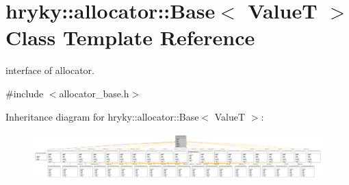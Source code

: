 \hypertarget{classhryky_1_1allocator_1_1_base}{\section{hryky\-:\-:allocator\-:\-:Base$<$ Value\-T $>$ Class Template Reference}
\label{classhryky_1_1allocator_1_1_base}
}


interface of allocator.  




{\ttfamily \#include $<$allocator\-\_\-base.\-h$>$}



Inheritance diagram for hryky\-:\-:allocator\-:\-:Base$<$ Value\-T $>$\-:
\nopagebreak
\begin{figure}[H]
\begin{center}
\leavevmode
\includegraphics[width=350pt]{classhryky_1_1allocator_1_1_base__inherit__graph}
\end{center}
\end{figure}
